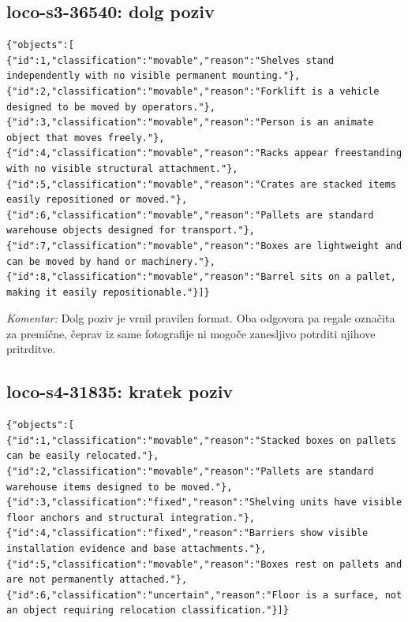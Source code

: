 \documentclass[11pt,a4paper]{article}
\begin{document}
\subsection{loco-s3-36540: dolg poziv}
\begin{lstlisting}
{"objects":[
{"id":1,"classification":"movable","reason":"Shelves stand independently with no visible permanent mounting."},
{"id":2,"classification":"movable","reason":"Forklift is a vehicle designed to be moved by operators."},
{"id":3,"classification":"movable","reason":"Person is an animate object that moves freely."},
{"id":4,"classification":"movable","reason":"Racks appear freestanding with no visible structural attachment."},
{"id":5,"classification":"movable","reason":"Crates are stacked items easily repositioned or moved."},
{"id":6,"classification":"movable","reason":"Pallets are standard warehouse objects designed for transport."},
{"id":7,"classification":"movable","reason":"Boxes are lightweight and can be moved by hand or machinery."},
{"id":8,"classification":"movable","reason":"Barrel sits on a pallet, making it easily repositionable."}]}
\end{lstlisting}
\textit{Komentar:} Dolg poziv je vrnil pravilen format. Oba odgovora pa regale označita za premične, čeprav iz same fotografije ni mogoče zanesljivo potrditi njihove pritrditve.

\subsection{loco-s4-31835: kratek poziv}
\begin{lstlisting}
{"objects":[
{"id":1,"classification":"movable","reason":"Stacked boxes on pallets can be easily relocated."},
{"id":2,"classification":"movable","reason":"Pallets are standard warehouse items designed to be moved."},
{"id":3,"classification":"fixed","reason":"Shelving units have visible floor anchors and structural integration."},
{"id":4,"classification":"fixed","reason":"Barriers show visible installation evidence and base attachments."},
{"id":5,"classification":"movable","reason":"Boxes rest on pallets and are not permanently attached."},
{"id":6,"classification":"uncertain","reason":"Floor is a surface, not an object requiring relocation classification."}]}
\end{lstlisting}
\end{document}
